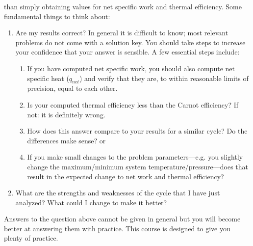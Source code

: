  than simply obtaining values for net specific work and thermal efficiency. Some fundamental things to think about:
\begin{enumerate}
\item Are my results correct?  In general it is difficult to know; most relevant problems do not come with a solution key.  You should take steps to increase your confidence that your answer is sensible.  A few essential steps include:
\begin{enumerate}
\item If you have computed net specific work, you should also compute net specific heat ($q_{net}$) and verify that they are, to within reasonable limits of precision, equal to each other. 
\item Is your computed thermal efficiency less than the Carnot efficiency?  If not: it is definitely wrong.
\item How does this answer compare to your results for a similar cycle?  Do the differences make sense? or
\item If you make small changes to the problem parameters---e.g. you slightly change the maximum/minimum system temperature/pressure---does that result in the expected change to net work and thermal efficiency?
\end{enumerate}
\item What are the strengths and weaknesses of the cycle that I have just analyzed? What could I change to make it better?  
\end{enumerate}
Answers to the question above cannot be given in general but you will become better at answering them with practice.  This course is designed to give you plenty of practice.



